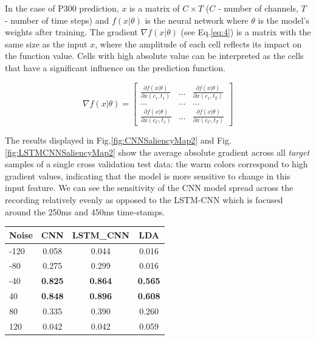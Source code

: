 \documentclass[
12pt, %
english, %
doublespacing, %
headsepline, %
]{MastersDoctoralThesis} %
\begin{document}
	In the case of P300 prediction, $x$ is a matrix of $C\times{T}$ ($C$ - number of channels, $T$ - number of time steps) and $f(x|\theta)$ is the neural network where $\theta$ is the model's weights after training. The gradient $\nabla{f(x|\theta)}$ (see Eq.\ref{eq:4}) is a matrix with the same size as the input $x$, where the amplitude of each cell reflects its impact on the function value. Cells with high absolute value can be interpreted as the cells that have a significant influence on the prediction function.
	
	
	\begin{equation}\label{eq:4}
	\nabla f\left( {x|\theta } \right) = \left[ {\begin{array}{*{20}{c}}
		{\frac{{\partial f\left( {x|\theta } \right)}}{{\partial x\left( {{c_1},{t_1}} \right)}}}&{...}&{\frac{{\partial f\left( {x|\theta } \right)}}{{\partial x\left( {{c_1},{t_T}} \right)}}}\\
		{...}&{...}&{...}\\
		{\frac{{\partial f\left( {x|\theta } \right)}}{{\partial x\left( {{c_C},{t_1}} \right)}}}&{...}&{\frac{{\partial f\left( {x|\theta } \right)}}{{\partial x\left( {{c_C},{t_T}} \right)}}}
		\end{array}} \right]
	\end{equation}

\vspace{1cm}
The results displayed in Fig.\ref{fig:CNNSaliencyMap2} and Fig.\ref{fig:LSTMCNNSaliencyMap2} show the average absolute gradient across all \textit{target} samples of a single cross validation test data: the warm colors correspond to high gradient values, indicating that the model is more sensitive to change in this input feature. We can see the sensitivity of the CNN model spread across the recording relatively evenly as opposed to the LSTM-CNN which is focused around the 250ms and 450ms time-stamps.

\begin{small}
	\label{table:ResistenceToNoise}
	\centering
	
	\begin{tabular}{l|ccc}
		\toprule
		{Noise} &  CNN &  LSTM\_CNN &  LDA\\
		\midrule
		-120  &         0.058 &              0.044 &         0.016 \\
		-80   &         0.275 &              0.299 &         0.016 \\
		-40   &         \textbf{0.825} &              \textbf{0.864} &  \textbf{0.565} \\
		40   &         \textbf{0.848} &              \textbf{0.896} &   \textbf{0.608} \\
		80   &         0.335 &              0.390 &         0.260 \\
		120  &         0.042 &              0.042 &         0.059 \\
		\bottomrule
	\end{tabular}
	
\end{small}
\end{document}
